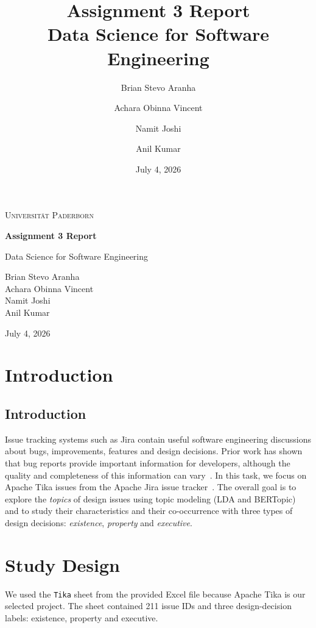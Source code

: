 \documentclass[11pt,a4paper]{report}
\title{\vspace{3cm}\Huge\bfseries Assignment 3 Report\\[0.5em]
       \large\mdseries Data Science for Software Engineering}
\author{Brian Stevo Aranha \and Achara Obinna Vincent \and
        Namit Joshi \and Anil Kumar}
\date{July 4, 2026}
\begin{document}
\begin{titlepage}
  \centering
  \vspace*{2cm}
  {\Large\scshape Universit\"at Paderborn\par}
  \vspace{3cm}
  {\Huge\bfseries Assignment 3 Report\par}
  \vspace{0.6cm}
  {\Large Data Science for Software Engineering\par}
  \vspace{3cm}
  {\large
   Brian Stevo Aranha\\
   Achara Obinna Vincent\\
   Namit Joshi\\
   Anil Kumar\par}
  \vspace{1.5cm}
  {\large July 4, 2026\par}
  \vfill
\end{titlepage}

\tableofcontents

\chapter{Introduction}
\section{Introduction}
Issue tracking systems such as Jira contain useful software engineering
discussions about bugs, improvements, features and design decisions. Prior work
has shown that bug reports provide important information for developers, although
the quality and completeness of this information can vary~\cite{bettenburg}. In
this task, we focus on Apache Tika issues from the Apache Jira issue
tracker~\cite{tika}. The overall goal is to explore the \emph{topics} of design
issues using topic modeling (LDA and BERTopic) and to study their
characteristics and their co-occurrence with three types of design decisions:
\emph{existence}, \emph{property} and \emph{executive}.

\chapter{Study Design}
We used the \texttt{Tika} sheet from the provided Excel file because Apache Tika
is our selected project. The sheet contained 211 issue IDs and three
design-decision labels: existence, property and executive.
\end{document}
